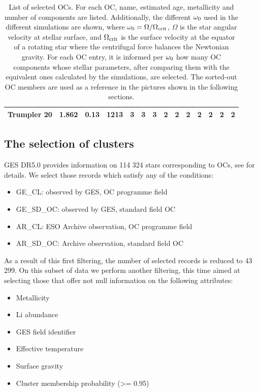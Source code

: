 \documentclass[fleqn,usenatbib]{mnras}
\begin{document}
\begin{table}
\begin{tabular}{|l l l l || c c c c c c c c c c|}
            Trumpler 20 & 1.862 & 0.13 & 1213 & 3 & 3 & 3 & 2 & 2 & 2 & 2 & 2 & 2 & 2\\
            \hline
	\end{tabular}
 	\caption{List of selected OCs. For each OC, name, estimated age, metallicity and number of components are listed. Additionally, the different $\omega_{\mathrm{0}}$ used in the different simulations are shown, where $\omega_{\mathrm{0}} = \Omega / \Omega_{\mathrm{crit}}$, $\Omega$ is the star angular velocity at stellar surface, and $\Omega_{\mathrm{crit}}$ is the surface velocity at the equator of a rotating star where the centrifugal force balances the Newtonian gravity. For each OC entry, it is informed per $\omega_{\mathrm{0}}$ how many OC components whose stellar parameters, after comparing them with the equivalent ones calculated by the simulations, are selected. The sorted-out OC members are used as a reference in the pictures shown in the following sections.}
  	\label{tab:oc_reduced_list}
\end{table}

\subsection{The selection of clusters}
GES DR5.0 provides information on 114 324 stars corresponding to OCs, see \citet{Gilmore2022} for details. We select those records which satisfy any of the conditions:
\begin{itemize}
    \item GE\_CL: observed by GES, OC programme field
    \item GE\_SD\_OC: observed by GES, standard field OC
    \item AR\_CL: ESO Archive observation, OC programme field
    \item AR\_SD\_OC: Archive observation, standard field OC
\end{itemize}

As a result of this first filtering, the number of selected records is reduced to 43 299. On this subset of data we perform another filtering, this time aimed at selecting those that offer not null information on the following attributes:
\begin{itemize}
    \item Metallicity
    \item Li abundance
    \item GES field identifier
    \item Effective temperature
    \item Surface gravity
    \item Cluster membership probability (>= 0.95)
\end{itemize}
\end{document}
